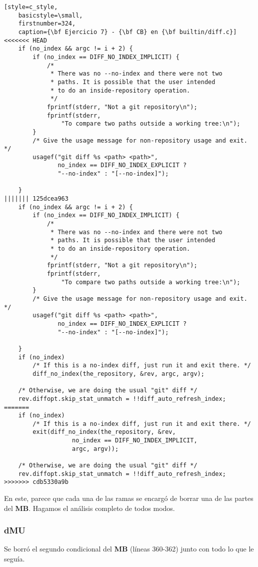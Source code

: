 \begin{lstlisting}[style=c_style,
	basicstyle=\small,
	firstnumber=324,
	caption={\bf Ejercicio 7} - {\bf CB} en {\bf builtin/diff.c}]
<<<<<<< HEAD
	if (no_index && argc != i + 2) {
		if (no_index == DIFF_NO_INDEX_IMPLICIT) {
			/*
			 * There was no --no-index and there were not two
			 * paths. It is possible that the user intended
			 * to do an inside-repository operation.
			 */
			fprintf(stderr, "Not a git repository\n");
			fprintf(stderr,
				"To compare two paths outside a working tree:\n");
		}
		/* Give the usage message for non-repository usage and exit. */
		usagef("git diff %s <path> <path>",
		       no_index == DIFF_NO_INDEX_EXPLICIT ?
		       "--no-index" : "[--no-index]");

	}
||||||| 125dcea963
	if (no_index && argc != i + 2) {
		if (no_index == DIFF_NO_INDEX_IMPLICIT) {
			/*
			 * There was no --no-index and there were not two
			 * paths. It is possible that the user intended
			 * to do an inside-repository operation.
			 */
			fprintf(stderr, "Not a git repository\n");
			fprintf(stderr,
				"To compare two paths outside a working tree:\n");
		}
		/* Give the usage message for non-repository usage and exit. */
		usagef("git diff %s <path> <path>",
		       no_index == DIFF_NO_INDEX_EXPLICIT ?
		       "--no-index" : "[--no-index]");

	}
	if (no_index)
		/* If this is a no-index diff, just run it and exit there. */
		diff_no_index(the_repository, &rev, argc, argv);

	/* Otherwise, we are doing the usual "git" diff */
	rev.diffopt.skip_stat_unmatch = !!diff_auto_refresh_index;
=======
	if (no_index)
		/* If this is a no-index diff, just run it and exit there. */
		exit(diff_no_index(the_repository, &rev,
				   no_index == DIFF_NO_INDEX_IMPLICIT,
				   argc, argv));

	/* Otherwise, we are doing the usual "git" diff */
	rev.diffopt.skip_stat_unmatch = !!diff_auto_refresh_index;
>>>>>>> cdb5330a9b
\end{lstlisting}

En este, parece que cada una de las ramas se encargó de borrar una de las partes del {\bf MB}. Hagamos el análisis completo
de todos modos.

\subsubsection*{dMU}
Se borró el segundo condicional del {\bf MB} (líneas 360-362) junto con todo lo que le seguía.

